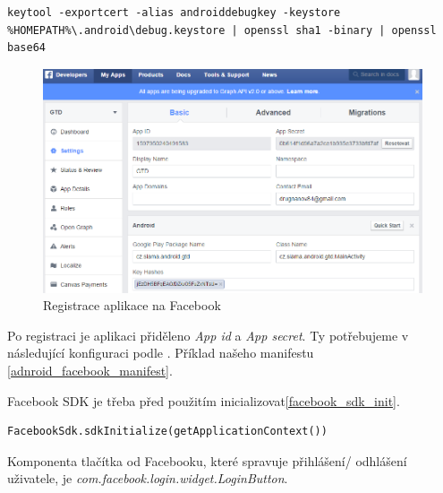 \documentclass[thesis=B,czech]{FITthesis}[2012/06/26]
\begin{document}
\begin{lstlisting}[label=facebook_key_hash,caption=Získání hashe vývojového klíče Android prostředí]
keytool -exportcert -alias androiddebugkey -keystore %HOMEPATH%\.android\debug.keystore | openssl sha1 -binary | openssl base64
\end{lstlisting}
  
\begin{figure}[h!]\centering
	\includegraphics[width=1\textwidth]{pictures/facebook_app_registration.png}
	\caption{Registrace aplikace na Facebook}
	\label{fig:facebok_registration}
\end{figure}

Po registraci je aplikaci přiděleno \textit{App id} a \textit{App secret}. Ty potřebujeme v následující konfiguraci podle \cite{android_facebook_manifest}. Příklad našeho manifestu \ref{adnroid_facebook_manifest}.



Facebook SDK je třeba před použitím inicializovat\ref{facebook_sdk_init}.
\begin{lstlisting}[label=facebook_sdk_init,caption=Inicializace Facebook SDK]
FacebookSdk.sdkInitialize(getApplicationContext())
\end{lstlisting}

Komponenta tlačítka od Facebooku, které spravuje přihlášení/ odhlášení uživatele, je \textit{com.facebook.login.widget.LoginButton}.\newline
\end{document}
